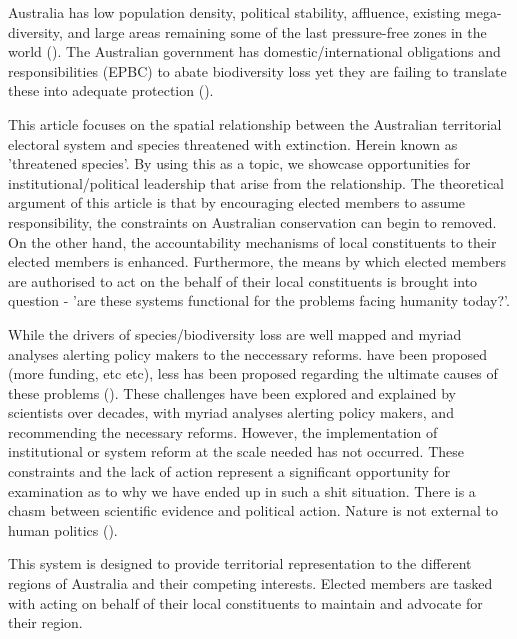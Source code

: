 \documentclass[a4paper,11pt]{article}
\begin{document}
Australia has low population density, political stability, affluence, existing mega-diversity, and large areas remaining some of the last pressure-free zones in the world (\cite{venterSixteenYearsChange2016}). 
The Australian government has domestic/international obligations and responsibilities (EPBC) to abate biodiversity loss yet they are failing to translate these into adequate protection (\cite{simmondsVulnerableSpeciesEcosystems2020,wardLotsLossLittle2019}).

This article focuses on the spatial relationship between the Australian territorial electoral system and species threatened with extinction. Herein known as 'threatened species'. By using this as a topic, we showcase opportunities for institutional/political leadership that arise from the relationship. The theoretical argument of this article is that by encouraging elected members to assume responsibility, the constraints on Australian conservation can begin to removed. On the other hand, the accountability mechanisms of local constituents to their elected members is enhanced. Furthermore, the means by which elected members are authorised to act on the behalf of their local constituents is brought into question - 'are these systems functional for the problems facing humanity today?'.

While the drivers of species/biodiversity loss are well mapped and myriad analyses alerting policy makers to the neccessary reforms. have been proposed (more funding, etc etc), less has been proposed regarding the ultimate causes of these problems (\cite{rydenLinkingDemocracyBiodiversity2020}).
These challenges have been explored and explained by scientists over decades, with myriad analyses alerting policy makers, and recommending the necessary reforms. However, the implementation of institutional or system reform at the scale needed has not occurred. These constraints and the lack of action represent a significant opportunity for examination as to why we have ended up in such a shit situation. There is a chasm between scientific evidence and political action.
Nature is not external to human politics (\cite{burkeSpeciesBordersPolitical2020}).

This system is designed to provide territorial representation to the different regions of Australia and their competing interests. Elected members are tasked with acting on behalf of their local constituents to maintain and advocate for their region.
\end{document}
